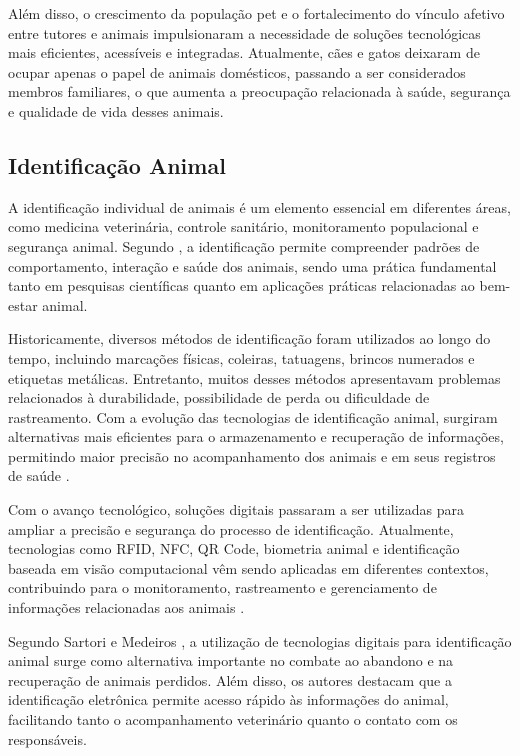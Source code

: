 \documentclass{UNESC}
\begin{document}
Além disso, o crescimento da população pet e o fortalecimento do vínculo afetivo entre tutores e animais impulsionaram a necessidade de soluções tecnológicas mais eficientes, acessíveis e integradas. Atualmente, cães e gatos deixaram de ocupar apenas o papel de animais domésticos, passando a ser considerados membros familiares, o que aumenta a preocupação relacionada à saúde, segurança e qualidade de vida desses animais.

\subsection{Identificação Animal}

A identificação individual de animais é um elemento essencial em diferentes áreas, como medicina veterinária, controle sanitário, monitoramento populacional e segurança animal. Segundo , a identificação permite compreender padrões de comportamento, interação e saúde dos animais, sendo uma prática fundamental tanto em pesquisas científicas quanto em aplicações práticas relacionadas ao bem-estar animal.

Historicamente, diversos métodos de identificação foram utilizados ao longo do tempo, incluindo marcações físicas, coleiras, tatuagens, brincos numerados e etiquetas metálicas. Entretanto, muitos desses métodos apresentavam problemas relacionados à durabilidade, possibilidade de perda ou dificuldade de rastreamento. Com a evolução das tecnologias de identificação animal, surgiram alternativas mais eficientes para o armazenamento e recuperação de informações, permitindo maior precisão no acompanhamento dos animais e em seus registros de saúde \cite{zhao2020,murphy2008}.


Com o avanço tecnológico, soluções digitais passaram a ser utilizadas para ampliar a precisão e segurança do processo de identificação. Atualmente, tecnologias como RFID, NFC, QR Code, biometria animal e identificação baseada em visão computacional vêm sendo aplicadas em diferentes contextos, contribuindo para o monitoramento, rastreamento e gerenciamento de informações relacionadas aos animais \cite{zhao2020,MORAES2024}.

Segundo Sartori e Medeiros \cite{sartori2018}, a utilização de tecnologias digitais para identificação animal surge como alternativa importante no combate ao abandono e na recuperação de animais perdidos. Além disso, os autores destacam que a identificação eletrônica permite acesso rápido às informações do animal, facilitando tanto o acompanhamento veterinário quanto o contato com os responsáveis.
\end{document}
